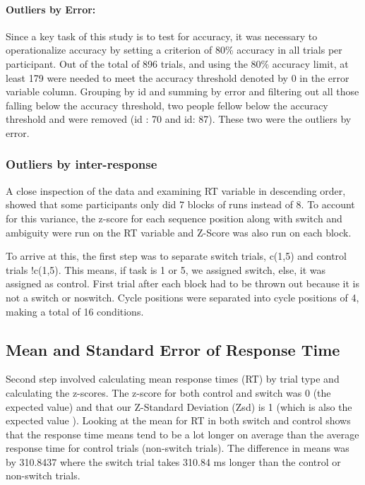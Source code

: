 \documentclass[
  11pt,
]{article}
\begin{document}
\paragraph{Outliers by Error:}\label{outliers-by-error}

Since a key task of this study is to test for accuracy, it was necessary
to operationalize accuracy by setting a criterion of 80\% accuracy in
all trials per participant. Out of the total of 896 trials, and using
the 80\% accuracy limit, at least 179 were needed to meet the accuracy
threshold denoted by 0 in the error variable column. Grouping by id and
summing by error and filtering out all those falling below the accuracy
threshold, two people fellow below the accuracy threshold and were
removed (id : 70 and id: 87). These two were the outliers by error.

\subsubsection{Outliers by
inter-response}\label{outliers-by-inter-response}

A close inspection of the data and examining RT variable in descending
order, showed that some participants only did 7 blocks of runs instead
of 8. To account for this variance, the z-score for each sequence
position along with switch and ambiguity were run on the RT variable and
Z-Score was also run on each block.

To arrive at this, the first step was to separate switch trials, c(1,5)
and control trials !c(1,5). This means, if task is 1 or 5, we assigned
switch, else, it was assigned as control. First trial after each block
had to be thrown out because it is not a switch or noswitch. Cycle
positions were separated into cycle positions of 4, making a total of 16
conditions.

\subsection{Mean and Standard Error of Response
Time}\label{mean-and-standard-error-of-response-time}

Second step involved calculating mean response times (RT) by trial type
and calculating the z-scores. The z-score for both control and switch
was 0 (the expected value) and that our Z-Standard Deviation (Zsd) is 1
(which is also the expected value ). Looking at the mean for RT in both
switch and control shows that the response time means tend to be a lot
longer on average than the average response time for control trials
(non-switch trials). The difference in means was by 310.8437 where the
switch trial takes 310.84 ms longer than the control or non-switch
trials.
\end{document}
